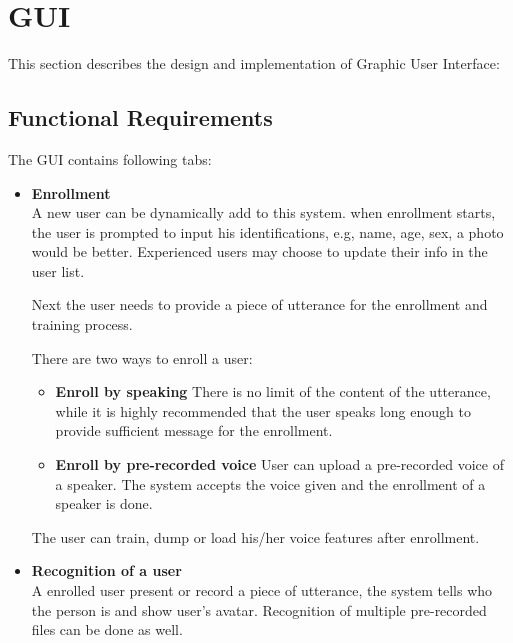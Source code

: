 \section{GUI}
	This section describes the design and implementation of Graphic User Interface:
\subsection{Functional Requirements}
	The GUI contains following tabs:
	\begin{itemize}
		\item \textbf{Enrollment} \\
			A new user can be dynamically add to this system.
			when enrollment starts, the user is prompted to input
			his identifications, e.g, name, age, sex, a photo would
			be better. Experienced users may choose to update their
			info in the user list.

			Next the user needs to provide a piece of utterance for
			the enrollment and training process.

			There are two ways to enroll a user:
			\begin{itemize}
				\item \textbf{Enroll by speaking}
					There is no limit of the content of the utterance, while
					it is highly recommended that the user speaks long enough
					to provide sufficient message for the enrollment.

				\item \textbf{Enroll by pre-recorded voice}
					User can upload a pre-recorded voice of a speaker. The system
					accepts the voice given and the enrollment of a speaker is done.
			\end{itemize}

			The user can train, dump or load his/her voice features after enrollment.

		\item \textbf{Recognition of a user} \\
			A enrolled user present or record a piece of utterance,
			the system tells who the person is and show user's avatar.
			Recognition of multiple pre-recorded files can be done as well.


\end{itemize}

